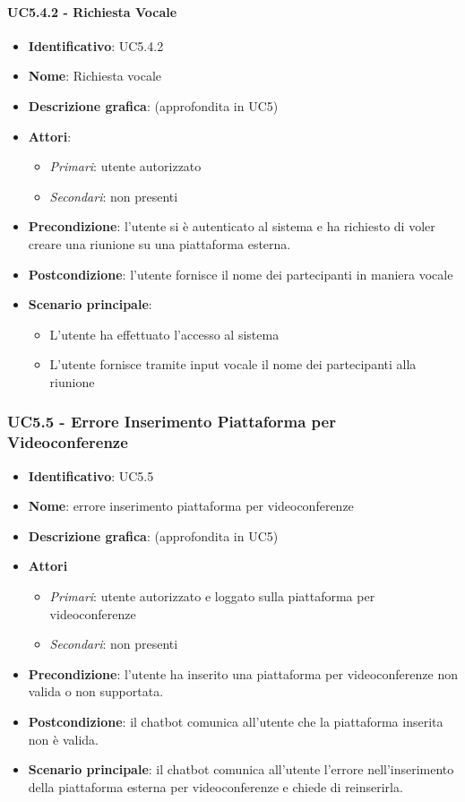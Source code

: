 \paragraph{UC5.4.2 - Richiesta Vocale}
\begin{itemize}
   \item \textbf{Identificativo}: UC5.4.2
   \item \textbf{Nome}: Richiesta vocale
   \item \textbf{Descrizione grafica}: (approfondita in UC5)
   \item \textbf{Attori}:
   \begin{itemize} 
       \item \textit{Primari}: utente autorizzato
       \item \textit{Secondari}: non presenti
   \end{itemize}
       \item \textbf{Precondizione}: l'utente si è autenticato al sistema e ha richiesto di voler creare una riunione su una piattaforma esterna.
       \item \textbf{Postcondizione}: l'utente fornisce il nome dei partecipanti in maniera vocale
    \item \textbf{Scenario principale}: 
       \begin{itemize}
           \item L'utente ha effettuato l'accesso al sistema 
           \item L'utente fornisce tramite input vocale il nome dei partecipanti alla riunione
       \end{itemize}
\end{itemize}

\subsubsection{UC5.5 - Errore Inserimento Piattaforma per Videoconferenze}
\begin{itemize}
    \item \textbf{Identificativo}: UC5.5
    \item \textbf{Nome}: errore inserimento piattaforma per videoconferenze
    \item \textbf{Descrizione grafica}: (approfondita in UC5)
    \item \textbf{Attori}
 \begin{itemize} 
    \item \textit{Primari}: utente autorizzato e loggato sulla piattaforma per videoconferenze
    \item \textit{Secondari}: non presenti
 \end{itemize}
 \item \textbf{Precondizione}: l'utente ha inserito una piattaforma per videoconferenze non valida o non supportata.
 \item \textbf{Postcondizione}: il chatbot comunica all'utente che la piattaforma inserita non è valida.
 \item \textbf{Scenario principale}: il chatbot comunica all'utente l'errore nell'inserimento della piattaforma esterna per videoconferenze e chiede di reinserirla.
\end{itemize}
